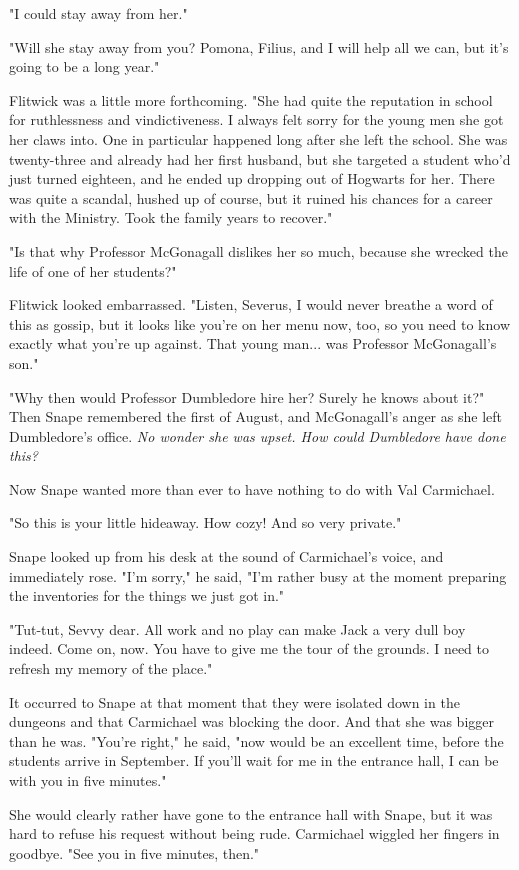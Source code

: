 "I could stay away from her."

"Will she stay away from you? Pomona, Filius, and I will help all we can, but it's going to be a long year."

Flitwick was a little more forthcoming. "She had quite the reputation in school for ruthlessness and vindictiveness. I always felt sorry for the young men she got her claws into. One in particular happened long after she left the school. She was twenty-three and already had her first husband, but she targeted a student who'd just turned eighteen, and he ended up dropping out of Hogwarts for her. There was quite a scandal, hushed up of course, but it ruined his chances for a career with the Ministry. Took the family years to recover."

"Is that why Professor McGonagall dislikes her so much, because she wrecked the life of one of her students?"

Flitwick looked embarrassed. "Listen, Severus, I would never breathe a word of this as gossip, but it looks like you're on her menu now, too, so you need to know exactly what you're up against. That young man... was Professor McGonagall's son."

"Why then would Professor Dumbledore hire her? Surely he knows about it?" Then Snape remembered the first of August, and McGonagall's anger as she left Dumbledore's office. \emph{No wonder she was upset. How could Dumbledore have done this?}

Now Snape wanted more than ever to have nothing to do with Val Carmichael.

"So this is your little hideaway. How cozy! And so very private."

Snape looked up from his desk at the sound of Carmichael's voice, and immediately rose. "I'm sorry," he said, "I'm rather busy at the moment preparing the inventories for the things we just got in."

"Tut-tut, Sevvy dear. All work and no play can make Jack a very dull boy indeed. Come on, now. You have to give me the tour of the grounds. I need to refresh my memory of the place."

It occurred to Snape at that moment that they were isolated down in the dungeons and that Carmichael was blocking the door. And that she was bigger than he was. "You're right," he said, "now would be an excellent time, before the students arrive in September. If you'll wait for me in the entrance hall, I can be with you in five minutes."

She would clearly rather have gone to the entrance hall with Snape, but it was hard to refuse his request without being rude. Carmichael wiggled her fingers in goodbye. "See you in five minutes, then."

